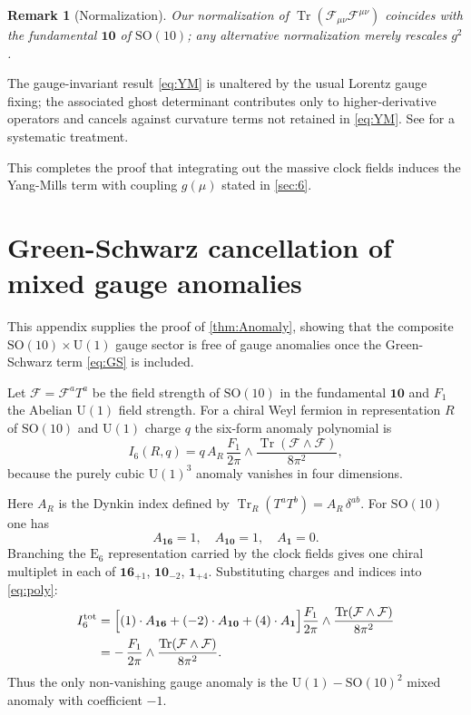 \documentclass[pdflatex,sn-mathphys-num]{sn-jnl}
\theoremstyle{thmstyleone}
\theoremstyle{thmstyletwo}%
\newtheorem{remark}{Remark}%
\theoremstyle{thmstylethree}%
\newcommand{\SO}[1]{\mathrm{SO(#1)}}
\newcommand{\U}[1]{\mathrm{U(#1)}}
\newcommand{\E}[1]{\mathrm{E_{#1}}}
\newcommand{\SOTen}{\SO{10}}
\newcommand{\UOne}{\U{1}}
\newcommand{\ESix}{\E{6}}
\newcommand{\Tr}{\operatorname{Tr}}
\begin{document}
\begin{appendices}
\begin{remark}[Normalization]
Our normalization of \(\Tr(\mathcal F_{\mu\nu}\mathcal
F^{\mu\nu})\) coincides with the fundamental
$\mathbf{10}$ of $\SOTen$; any alternative normalization merely rescales
\(g^{2}\).
\end{remark}

The gauge-invariant result \eqref{eq:YM} is unaltered by the usual
Lorentz gauge fixing; the associated ghost determinant contributes only
to higher-derivative operators and cancels against curvature terms
not retained in \eqref{eq:YM}. See \cite{AlvarezGaume:1984} for a
systematic treatment.

This completes the proof that integrating out the massive clock fields
induces the Yang-Mills term with coupling \(g(\mu)\) stated in \autoref{sec:6}.

\section{Green-Schwarz cancellation of mixed gauge anomalies}
\label{app:Anomaly}
This appendix supplies the proof of \autoref{thm:Anomaly},
showing that the composite \(\SOTen\times \UOne\) gauge sector is free of
gauge anomalies once the Green-Schwarz term \eqref{eq:GS} is included.

Let \(\mathcal F=\mathcal F^{a}T^{a}\) be the field strength of
\(\SOTen\) in the fundamental $\mathbf{10}$ and \(F_{1}\) the
Abelian \(\UOne\) field strength.  For a chiral Weyl fermion in
representation \(R\) of \(\SOTen\) and \(\UOne\) charge \(q\) the
six-form anomaly polynomial is
\begin{equation}
  I_{6}(R,q)=q\,A_{R}\,\frac{F_{1}}{2\pi}\wedge
             \frac{\Tr(\mathcal F\wedge\mathcal F)}{8\pi^{2}},
\label{eq:poly}
\end{equation}
because the purely cubic \(\UOne^{3}\) anomaly vanishes in four
dimensions.

Here \(A_{R}\) is the Dynkin index defined by
\(\Tr_{R}(T^{a}T^{b})=A_{R}\,\delta^{ab}\).
For \(\SOTen\) one has
\[
  A_{\mathbf{16}}=1,\quad
  A_{\mathbf{10}}=1,\quad
  A_{\mathbf{1}}=0.
\]
Branching the $\ESix$ representation carried by the clock fields gives
one chiral multiplet in each of
$\mathbf{16}_{+1}$, $\mathbf{10}_{-2}$, $\mathbf 1_{+4}$.
Substituting charges and indices into \eqref{eq:poly}:
\begin{equation}\label{eq:Itot}
  \begin{aligned}
  I_{6}^{\text{tot}}
  &=\Bigl[
      (1)\cdot A_{\mathbf{16}}
      +(-2)\cdot A_{\mathbf{10}}
      +(4)\cdot A_{\mathbf{1}}
    \Bigr]
    \frac{F_{1}}{2\pi}\wedge
    \frac{\Tr(\mathcal F\wedge\mathcal F)}{8\pi^{2}}\\
  &=
  -\,\frac{F_{1}}{2\pi}\wedge
      \frac{\Tr(\mathcal F\wedge\mathcal F)}{8\pi^{2}}.
  \end{aligned}
\end{equation}
Thus the only non-vanishing gauge anomaly is the
\(\UOne-\SOTen^{2}\) mixed anomaly with coefficient \(-1\).


\end{appendices}
\end{document}
